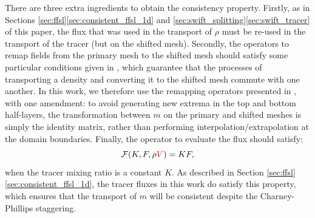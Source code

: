 \documentclass{ametsocV6.1}
\newcommand{\change}[1]{\textcolor{red}{#1}}
\begin{document}
There are three extra ingredients to obtain the consistency property.
Firstly, as in Sections \ref{sec:ffsl}\ref{sec:consistent_ffsl_1d}  and \ref{sec:swift_splitting}\ref{sec:swift_tracer} of this paper, the flux that was used in the transport of $\rho$ must be re-used in the transport of the tracer (but on the shifted mesh).
Secondly, the operators to remap fields from the primary mesh to the shifted mesh should satisfy some particular conditions given in \citet{bendall2023solution}, which guarantee that the processes of transporting a density and converting it to the shifted mesh commute with one another.
In this work, we therefore use the remapping operators presented in \citet{bendall2023solution}, with one amendment: to avoid generating new extrema in the top and bottom half-layers, the transformation between $m$ on the primary and shifted meshes is simply the identity matrix, rather than performing interpolation/extrapolation at the domain boundaries.
Finally, the operator to evaluate the flux should satisfy:
\begin{equation}
\mathcal{F}(K,F,\rho\change{V}) = KF,
\end{equation}
when the tracer mixing ratio is a constant $K$.
As described in Section \ref{sec:ffsl}\ref{sec:consistent_ffsl_1d}, the tracer fluxes in this work do satisfy this property, which ensures that the transport of $m$ will be consistent despite the Charney-Phillips staggering.
\end{document}
